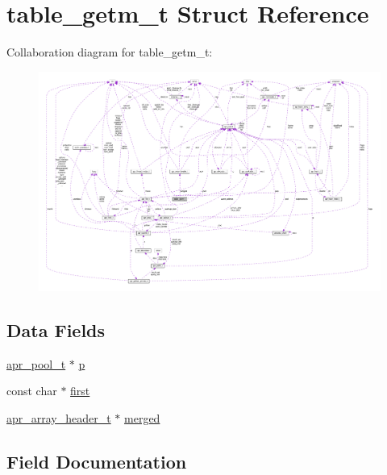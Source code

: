 \hypertarget{structtable__getm__t}{}\section{table\+\_\+getm\+\_\+t Struct Reference}
\label{structtable__getm__t}


Collaboration diagram for table\+\_\+getm\+\_\+t\+:
\nopagebreak
\begin{figure}[H]
\begin{center}
\leavevmode
\includegraphics[width=350pt]{structtable__getm__t__coll__graph}
\end{center}
\end{figure}
\subsection*{Data Fields}
\begin{DoxyCompactItemize}
\item 
\hyperlink{structapr__pool__t}{apr\+\_\+pool\+\_\+t} $\ast$ \hyperlink{structtable__getm__t_a41552a64f15e1c1b8b1687b3a9648d02}{p}
\item 
const char $\ast$ \hyperlink{structtable__getm__t_ad94d941ffa782520abf0f6507f81edd9}{first}
\item 
\hyperlink{structapr__array__header__t}{apr\+\_\+array\+\_\+header\+\_\+t} $\ast$ \hyperlink{structtable__getm__t_a1c57a4920f4f0de0b9777a1e5584c084}{merged}
\end{DoxyCompactItemize}


\subsection{Field Documentation}
